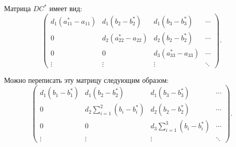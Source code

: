 \begin{multicols}{2}
\noindent 
Матрица $DC^{*}$ имеет вид:
\begin{equation*}
 \left(
\begin{array}{cccc}
d_1\left( a_{11}^*- a_{11}\right)                             & 
d_1\left( b_2-b_2^*\right)                 & d_1\left( b_3-
b_3^*\right)             & \cdots \\
0                                                                  & 
d_2\left( a_{22}^*- a_{22}\right)          & d_2\left( b_2-
b_2^*\right)             & \cdots \\
0                                                                  & 0                                               
& d_3\left( a_{33}^*- a_{33}\right)      & \cdots \\
\vdots                                                             & \vdots                                          
& \vdots                                      & \ddots
 \end{array}
\right).
\end{equation*}

\noindent Можно переписать эту матрицу следующим образом:
\begin{equation*}
 \left(
\begin{array}{cccc}
d_1\left( b_1-b_1^*\right)                          & d_1\left( b_2-
b_2^*\right)                 & d_1\left( b_3-b_3^*\right)             & 
\cdots \\
0                                                        & 
d_2\displaystyle\sum\limits_{i=1}^{2} \left(  b_{i} - b_{i}^*\right)          & d_2\left( 
b_2-b_2^*\right)             & \cdots \\
0                                                        & 0                                               
& d_3\displaystyle \sum\limits_{i=1}^{3} \left(  b_{i} - b_{i}^*\right)      & \cdots \\
\vdots                                                   & \vdots                                          
& \vdots                                      & \ddots
 \end{array}
\right).
\end{equation*}


\end{multicols}
